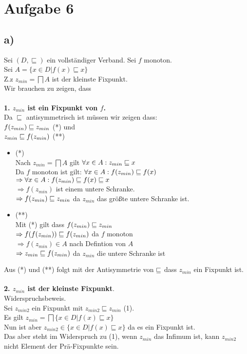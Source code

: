 \section*{Aufgabe 6}

\subsection*{a)}
Sei $(D,\sqsubseteq)$ ein vollständiger Verband. Sei $f$ monoton.\\
Sei $A = \{x \in D | f(x) \sqsubseteq x \}$\\
Z.z $z_{min} = \bigsqcap A$ ist der kleinste Fixpunkt.\\
Wir brauchen zu zeigen, dass\\\\
\textbf{1. $z_{min}$ ist ein Fixpunkt von $f$.}\\
Da $\sqsubseteq$ antisymmetrisch ist müssen wir zeigen dass:\\
$f(z_{min}) \sqsubseteq z_{min}$ (*)  und\\
$z_{min} \sqsubseteq f(z_{min}) $ (**) \\
\begin{itemize}
\item(*)\\
Nach $z_{min} = \bigsqcap A$ gilt $\forall x \in A : z_{min} \sqsubseteq x$\\
Da $f$ monoton ist gilt: $\forall x \in A : f(z_{min}) \sqsubseteq f(x)$\\
$\Rightarrow \forall x \in A : f(z_{min}) \sqsubseteq f(x)  \sqsubseteq x$\\
$\Rightarrow f(z_{min})$ ist einem untere Schranke.\\
$\Rightarrow  f(z_{min}) \sqsubseteq z_{min} $ da $z_{min}$ das größte untere Schranke  ist.\\

\item(**)\\
Mit (*) gilt dass $f(z_{min}) \sqsubseteq z_{min}$\\
$\Rightarrow f(f(z_{min})) \sqsubseteq f(z_{min})$ da $f$ monoton \\
$\Rightarrow f(z_{min}) \in A$ nach Defintion von $A$\\
$\Rightarrow z_{min} \sqsubseteq f(z_{min})$ da $z_{min}$ die untere Schranke ist\\
\end{itemize}
Aus (*) und (**) folgt mit der Antisymmetrie von $\sqsubseteq$ dass $z_{min}$ ein Fixpunkt ist.\\\\
\textbf{2. $z_{min}$ ist der kleinste Fixpunkt}.\\
Widerspruchsbeweis.\\
Sei $z_{min2}$ ein Fixpunkt mit $z_{min2} \sqsubseteq z_{min}$ (1).\\
Es gilt $z_{min} = \bigsqcap \{x \in D | f(x) \sqsubseteq x \}$\\
Nun ist aber $z_{min2} \in \{x \in D | f(x) \sqsubseteq x \}$ da es ein Fixpunkt ist.\\
Das aber steht im Widerspruch zu (1), wenn $z_{min}$ das Infimum ist, kann $z_{min2}$ nicht Element der Prä-Fixpunkte sein.
 

